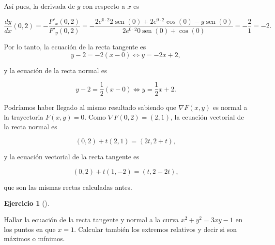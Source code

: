 \documentclass[
  spanish,
  a4paper,
]{scrreport}
\theoremstyle{definition}
\newtheorem{exercise}{Ejercicio}[chapter]
\theoremstyle{remark}
\begin{document}
\begin{tcolorbox}
Así pues, la derivada de \(y\) con respecto a \(x\) es

\[
\frac{dy}{dx} (0,2)
= -\frac{F'_x(0,2)}{F'_y(0,2)} 
= -\frac{2e^{0\cdot 2}2 \operatorname{sen}(0) + 2e^{0\cdot 2} \cos(0) - y \operatorname{sen}(0)}{2e^{0\cdot 2}0 \operatorname{sen}(0) + \cos(0)}
= -\frac{2}{1} 
= -2.
\]

Por lo tanto, la ecuación de la recta tangente es \[
y-2 = -2(x-0) \Leftrightarrow y = -2x+2,
\]

y la ecuación de la recta normal es

\[
y-2 = \frac{1}{2}(x-0) \Leftrightarrow y = \frac{1}{2}x+2.
\]

Podríamos haber llegado al mismo resultado sabiendo que
\(\nabla F(x,y)\) es normal a la trayectoria \(F(x,y)=0\). Como
\(\nabla F(0,2) = (2,1)\), la ecuación vectorial de la recta normal es

\[
(0, 2) + t (2, 1) = (2t, 2+t),
\]

y la ecuación vectorial de la recta tangente es

\[
(0, 2) + t (1, -2) = (t, 2-2t),
\]

que son las mismas rectas calculadas antes.

\end{tcolorbox}

\begin{exercise}[]\protect\hypertarget{exr-derivada-implicita-trayectoria-extremos}{}\label{exr-derivada-implicita-trayectoria-extremos}

Hallar la ecuación de la recta tangente y normal a la curva
\(x^2+y^2=3xy-1\) en los puntos en que \(x=1\). Calcular también los
extremos relativos y decir si son máximos o mínimos.

\end{exercise}
\end{document}
